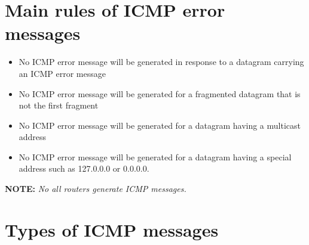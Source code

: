 \section{Main rules of ICMP error messages}
\begin{itemize}
\item{No ICMP error message will be generated in response to a datagram carrying an ICMP error message}
\item{No ICMP error message will be generated for a fragmented datagram that is not the first fragment}
\item{No ICMP error message will be generated for a datagram having a multicast address}
\item{No ICMP error message will be generated for a datagram having a special address such as 127.0.0.0 or 0.0.0.0.}
\end{itemize}
\textbf{NOTE:} \textit{No all routers generate ICMP messages.}

\section{Types of ICMP messages}
